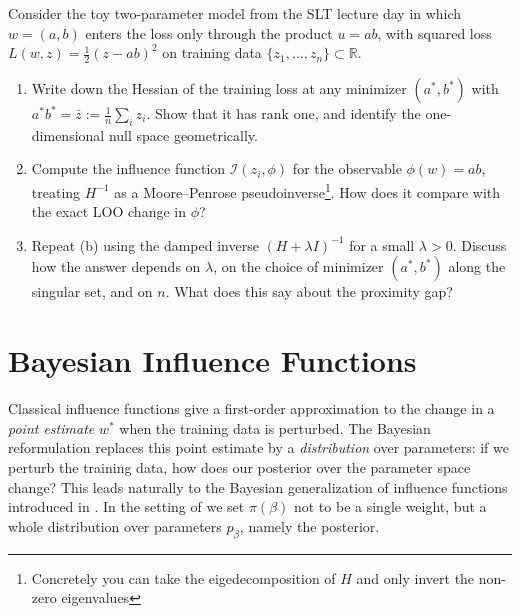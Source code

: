\documentclass[11pt]{article}
\begin{document}
\begin{exercise}\label{ex:if-degenerate}
Consider the toy two-parameter model from the SLT lecture day in which $w = (a,b)$ enters the loss only through the product $u = ab$, with squared loss $L(w,z) = \tfrac12(z - ab)^2$ on training data $\{z_1,\dots,z_n\}\subset\mathbb{R}$.
\begin{enumerate}
  \item[(a)] Write down the Hessian of the training loss at any minimizer $(a^*,b^*)$ with $a^* b^* = \bar z := \tfrac1n\sum_i z_i$. Show that it has rank one, and identify the one-dimensional null space geometrically.
  \item[(b)] Compute the influence function $\mathcal{I}(z_i,\phi)$ for the observable $\phi(w) = ab$, treating $H^{-1}$ as a Moore--Penrose pseudoinverse\footnote{Concretely you can take the eigedecomposition of $H$ and only invert the non-zero eigenvalues}. How does it compare with the exact LOO change in $\phi$?
  \item[(c)] Repeat (b) using the damped inverse $(H + \lambda I)^{-1}$ for a small $\lambda > 0$. Discuss how the answer depends on $\lambda$, on the choice of minimizer $(a^*,b^*)$ along the singular set, and on $n$. What does this say about the proximity gap?
\end{enumerate}
\end{exercise}

\section{Bayesian Influence Functions}\label{sec:bayesian-if}

Classical influence functions give a first-order approximation to the change in a \emph{point estimate} $w^*$ when the training data is perturbed. The Bayesian reformulation replaces this point estimate by a \emph{distribution} over parameters: if we perturb the training data, how does our posterior over the parameter space change? This leads naturally to the Bayesian generalization of influence functions introduced in \citet{kreer2025bif}. In the setting of  we set $\pi(\beta)$ not to be a single weight, but a whole distribution over parameters $p_{\beta}$, namely the posterior.
\end{document}
